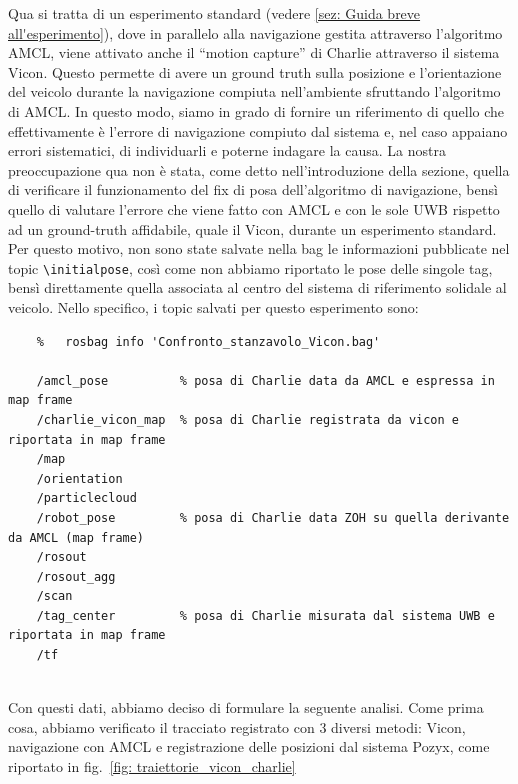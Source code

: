 Qua si tratta di un esperimento standard (vedere \ref{sez: Guida breve all'esperimento}), dove in parallelo alla navigazione gestita attraverso l'algoritmo AMCL, viene attivato anche il ``motion capture''
di Charlie attraverso il sistema Vicon. Questo permette di avere un ground truth sulla posizione e l'orientazione del veicolo durante la navigazione compiuta
nell'ambiente sfruttando l'algoritmo di AMCL. In questo modo, siamo in grado di fornire un riferimento di quello che effettivamente è l'errore di navigazione compiuto dal sistema e, nel caso appaiano errori sistematici, di individuarli e poterne indagare la causa.
La nostra preoccupazione qua non è stata, come detto nell'introduzione della sezione, quella di verificare il funzionamento del fix di posa dell'algoritmo di navigazione, bensì quello di valutare l'errore che viene fatto con AMCL e con le sole UWB rispetto ad un ground-truth affidabile, quale il Vicon, durante un esperimento standard. Per questo motivo, non sono state salvate nella bag le informazioni pubblicate nel topic \verb|\initialpose|, così come non abbiamo riportato le pose delle singole tag, bensì direttamente quella associata al centro del sistema di riferimento solidale al veicolo.
Nello specifico, i topic salvati per questo esperimento sono:
\begin{verbatim}
	%	rosbag info 'Confronto_stanzavolo_Vicon.bag'
	
	/amcl_pose			% posa di Charlie data da AMCL e espressa in map frame 
	/charlie_vicon_map	% posa di Charlie registrata da vicon e riportata in map frame
	/map
	/orientation
	/particlecloud
	/robot_pose			% posa di Charlie data ZOH su quella derivante da AMCL (map frame)
	/rosout
	/rosout_agg
	/scan   
	/tag_center			% posa di Charlie misurata dal sistema UWB e riportata in map frame
	/tf     
	
\end{verbatim}

Con questi dati, abbiamo deciso di formulare la seguente analisi.
Come prima cosa, abbiamo verificato il tracciato registrato con 3 diversi metodi: Vicon, navigazione con AMCL e registrazione delle posizioni dal sistema Pozyx, come riportato in fig.~\ref{fig: traiettorie_vicon_charlie}


